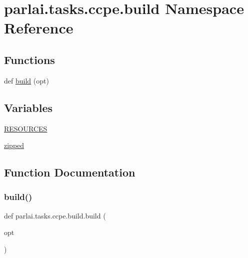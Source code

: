 \hypertarget{namespaceparlai_1_1tasks_1_1ccpe_1_1build}{}\section{parlai.\+tasks.\+ccpe.\+build Namespace Reference}
\label{namespaceparlai_1_1tasks_1_1ccpe_1_1build}
\subsection*{Functions}
\begin{DoxyCompactItemize}
\item 
def \hyperlink{namespaceparlai_1_1tasks_1_1ccpe_1_1build_a3c36666a37a2334071b6372b999d94ca}{build} (opt)
\end{DoxyCompactItemize}
\subsection*{Variables}
\begin{DoxyCompactItemize}
\item 
\hyperlink{namespaceparlai_1_1tasks_1_1ccpe_1_1build_a6a7c15b8accd9c13dc5a4781226de210}{R\+E\+S\+O\+U\+R\+C\+ES}
\item 
\hyperlink{namespaceparlai_1_1tasks_1_1ccpe_1_1build_a53415c3070df90c98065a01b2cc77606}{zipped}
\end{DoxyCompactItemize}


\subsection{Function Documentation}
\mbox{\label{namespaceparlai_1_1tasks_1_1ccpe_1_1build_a3c36666a37a2334071b6372b999d94ca}} 
\subsubsection{\texorpdfstring{build()}{build()}}
{\footnotesize\ttfamily def parlai.\+tasks.\+ccpe.\+build.\+build (\begin{DoxyParamCaption}\item[{}]{opt }\end{DoxyParamCaption})}



